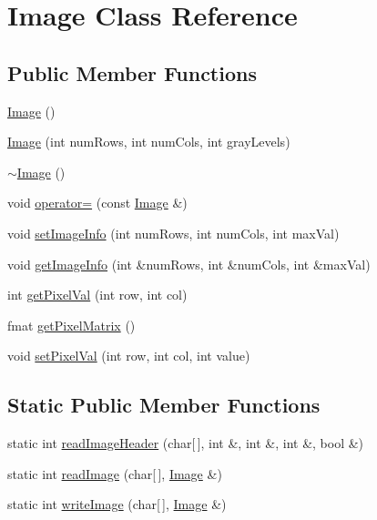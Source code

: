 \hypertarget{class_image}{\section{Image Class Reference}
\label{class_image}
}
\subsection*{Public Member Functions}
\begin{DoxyCompactItemize}
\item 
\hyperlink{class_image_a58edd1c45b4faeb5f789b0d036d02313}{Image} ()
\item 
\hyperlink{class_image_a92270fcd911d00f7755dc9ca35ef8f0b}{Image} (int num\-Rows, int num\-Cols, int gray\-Levels)
\item 
\hyperlink{class_image_a0294f63700543e11c0f0da85601c7ae5}{$\sim$\-Image} ()
\item 
void \hyperlink{class_image_a1099139cd7f3d212d57e9e8ce3e67a4d}{operator=} (const \hyperlink{class_image}{Image} \&)
\item 
void \hyperlink{class_image_af740f15bc8d30ee414049d5cb040cabd}{set\-Image\-Info} (int num\-Rows, int num\-Cols, int max\-Val)
\item 
void \hyperlink{class_image_a543e422a7edacaa55830dbd48a0f0957}{get\-Image\-Info} (int \&num\-Rows, int \&num\-Cols, int \&max\-Val)
\item 
int \hyperlink{class_image_a4ea2c59a4589aa328651eb035950b11c}{get\-Pixel\-Val} (int row, int col)
\item 
fmat \hyperlink{class_image_a925af65e2cadcf192f5cfa4ca22c0f2d}{get\-Pixel\-Matrix} ()
\item 
void \hyperlink{class_image_a430700d765365908172a3618daffd1ef}{set\-Pixel\-Val} (int row, int col, int value)
\end{DoxyCompactItemize}
\subsection*{Static Public Member Functions}
\begin{DoxyCompactItemize}
\item 
static int \hyperlink{class_image_a5b2753a2cb9c53a7fa884f09a625098f}{read\-Image\-Header} (char\mbox{[}$\,$\mbox{]}, int \&, int \&, int \&, bool \&)
\item 
static int \hyperlink{class_image_a63b87c82bcfe8e4a108bc2117439239b}{read\-Image} (char\mbox{[}$\,$\mbox{]}, \hyperlink{class_image}{Image} \&)
\item 
static int \hyperlink{class_image_a43975d2642ebd2c7df1fedb409b6e043}{write\-Image} (char\mbox{[}$\,$\mbox{]}, \hyperlink{class_image}{Image} \&)
\end{DoxyCompactItemize}
